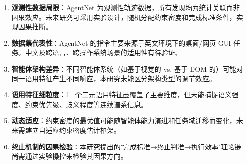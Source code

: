 \documentclass[12pt,a4paper,openany,oneside]{ctexrep}
\begin{document}
\begin{enumerate}
\item[1.] \textbf{观测性数据局限}：AgentNet 为观测性轨迹数据，所有发现均为统计关联而非因果效应。未来研究可采用实验设计，随机分配约束密度和完成标准条件，实现因果推断。
\item[2.] \textbf{数据集代表性}：AgentNet 的指令主要来源于英文环境下的桌面/网页 GUI 任务。中文及跨语言、跨操作系统场景的适用性有待验证。
\item[3.] \textbf{智能体架构差异}：不同智能体系统（如基于视觉的 vs. 基于 DOM 的）可能对同一语用特征产生不同响应，本研究未能区分架构类型的调节效应。
\item[4.] \textbf{语用特征细粒度}：11 个二元语用特征虽覆盖了主要维度，但未能捕捉语义强度、约束优先级、歧义程度等连续谱系信息。
\item[5.] \textbf{动态适应}：约束密度的最优值可能随智能体能力演进和任务域迁移而变化，未来需建立自适应约束密度估计框架。
\item[6.] \textbf{终止机制的因果检验}：本研究提出的"完成标准→终止判准→执行效率"理论链尚需通过实验操控来检验其因果方向。
\end{enumerate}


\newpage
\end{document}
